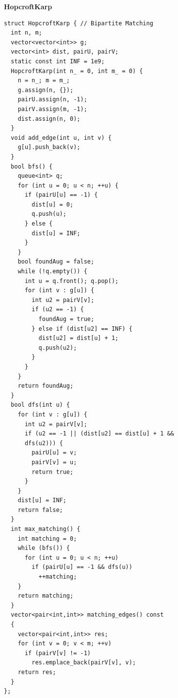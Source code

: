\textbf{HopcroftKarp}
\begin{lstlisting}
struct HopcroftKarp { // Bipartite Matching
  int n, m;
  vector<vector<int>> g;
  vector<int> dist, pairU, pairV;
  static const int INF = 1e9;
  HopcroftKarp(int n_ = 0, int m_ = 0) {
    n = n_; m = m_;
    g.assign(n, {});
    pairU.assign(n, -1);
    pairV.assign(m, -1);
    dist.assign(n, 0);
  }
  void add_edge(int u, int v) {
    g[u].push_back(v);
  }
  bool bfs() {
    queue<int> q;
    for (int u = 0; u < n; ++u) {
      if (pairU[u] == -1) {
        dist[u] = 0;
        q.push(u);
      } else {
        dist[u] = INF;
      }
    }
    bool foundAug = false;
    while (!q.empty()) {
      int u = q.front(); q.pop();
      for (int v : g[u]) {
        int u2 = pairV[v];
        if (u2 == -1) {
          foundAug = true;
        } else if (dist[u2] == INF) {
          dist[u2] = dist[u] + 1;
          q.push(u2);
        }
      }
    }
    return foundAug;
  }
  bool dfs(int u) {
    for (int v : g[u]) {
      int u2 = pairV[v];
      if (u2 == -1 || (dist[u2] == dist[u] + 1 &&
      dfs(u2))) {
        pairU[u] = v;
        pairV[v] = u;
        return true;
      }
    }
    dist[u] = INF;
    return false;
  }
  int max_matching() {
    int matching = 0;
    while (bfs()) {
      for (int u = 0; u < n; ++u)
        if (pairU[u] == -1 && dfs(u))
          ++matching;
    }
    return matching;
  }
  vector<pair<int,int>> matching_edges() const
  {
    vector<pair<int,int>> res;
    for (int v = 0; v < m; ++v)
      if (pairV[v] != -1)
        res.emplace_back(pairV[v], v);
    return res;
  }
};
\end{lstlisting}
